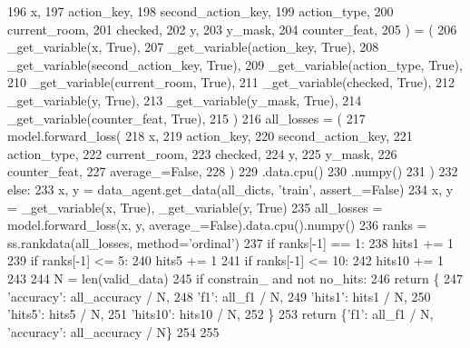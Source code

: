 \begin{DoxyCode}
196                     x,
197                     action\_key,
198                     second\_action\_key,
199                     action\_type,
200                     current\_room,
201                     checked,
202                     y,
203                     y\_mask,
204                     counter\_feat,
205                 ) = (
206                     \_get\_variable(x, \textcolor{keyword}{True}),
207                     \_get\_variable(action\_key, \textcolor{keyword}{True}),
208                     \_get\_variable(second\_action\_key, \textcolor{keyword}{True}),
209                     \_get\_variable(action\_type, \textcolor{keyword}{True}),
210                     \_get\_variable(current\_room, \textcolor{keyword}{True}),
211                     \_get\_variable(checked, \textcolor{keyword}{True}),
212                     \_get\_variable(y, \textcolor{keyword}{True}),
213                     \_get\_variable(y\_mask, \textcolor{keyword}{True}),
214                     \_get\_variable(counter\_feat, \textcolor{keyword}{True}),
215                 )
216                 all\_losses = (
217                     model.forward\_loss(
218                         x,
219                         action\_key,
220                         second\_action\_key,
221                         action\_type,
222                         current\_room,
223                         checked,
224                         y,
225                         y\_mask,
226                         counter\_feat,
227                         average\_=\textcolor{keyword}{False},
228                     )
229                     .data.cpu()
230                     .numpy()
231                 )
232             \textcolor{keywordflow}{else}:
233                 x, y = data\_agent.get\_data(all\_dicts, \textcolor{stringliteral}{'train'}, assert\_=\textcolor{keyword}{False})
234                 x, y = \_get\_variable(x, \textcolor{keyword}{True}), \_get\_variable(y, \textcolor{keyword}{True})
235                 all\_losses = model.forward\_loss(x, y, average\_=\textcolor{keyword}{False}).data.cpu().numpy()
236             ranks = ss.rankdata(all\_losses, method=\textcolor{stringliteral}{'ordinal'})
237             \textcolor{keywordflow}{if} ranks[-1] == 1:
238                 hits1 += 1
239             \textcolor{keywordflow}{if} ranks[-1] <= 5:
240                 hits5 += 1
241             \textcolor{keywordflow}{if} ranks[-1] <= 10:
242                 hits10 += 1
243 
244     N = len(valid\_data)
245     \textcolor{keywordflow}{if} constrain\_ \textcolor{keywordflow}{and} \textcolor{keywordflow}{not} no\_hits:
246         \textcolor{keywordflow}{return} \{
247             \textcolor{stringliteral}{'accuracy'}: all\_accuracy / N,
248             \textcolor{stringliteral}{'f1'}: all\_f1 / N,
249             \textcolor{stringliteral}{'hits1'}: hits1 / N,
250             \textcolor{stringliteral}{'hits5'}: hits5 / N,
251             \textcolor{stringliteral}{'hits10'}: hits10 / N,
252         \}
253     \textcolor{keywordflow}{return} \{\textcolor{stringliteral}{'f1'}: all\_f1 / N, \textcolor{stringliteral}{'accuracy'}: all\_accuracy / N\}
254 
255 
\end{DoxyCode}
